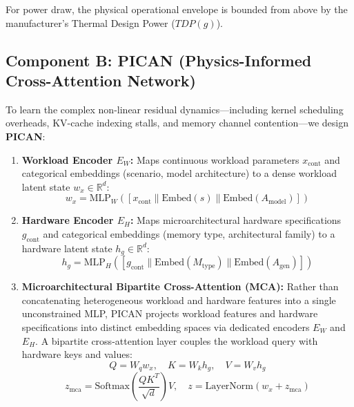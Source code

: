 \documentclass[preprint,12pt]{elsarticle}
\begin{document}
For power draw, the physical operational envelope is bounded from above by the manufacturer's Thermal Design Power ($TDP(g)$).

\subsection{Component B: PICAN (Physics-Informed Cross-Attention Network)}
To learn the complex non-linear residual dynamics---including kernel scheduling overheads, KV-cache indexing stalls, and memory channel contention---we design \textbf{PICAN}:

\begin{enumerate}
    \item \textbf{Workload Encoder $E_W$:} Maps continuous workload parameters $x_{\text{cont}}$ and categorical embeddings (scenario, model architecture) to a dense workload latent state $w_x \in \mathbb{R}^d$:
    \begin{equation}
    w_x = \text{MLP}_W\left( [x_{\text{cont}} \parallel \text{Embed}(s) \parallel \text{Embed}(A_{\text{model}})] \right)
    \end{equation}
    \item \textbf{Hardware Encoder $E_H$:} Maps microarchitectural hardware specifications $g_{\text{cont}}$ and categorical embeddings (memory type, architectural family) to a hardware latent state $h_g \in \mathbb{R}^d$:
    \begin{equation}
    h_g = \text{MLP}_H\left( [g_{\text{cont}} \parallel \text{Embed}(M_{\text{type}}) \parallel \text{Embed}(A_{\text{gen}})] \right)
    \end{equation}
    \item \textbf{Microarchitectural Bipartite Cross-Attention (MCA):} Rather than concatenating heterogeneous workload and hardware features into a single unconstrained MLP, PICAN projects workload features and hardware specifications into distinct embedding spaces via dedicated encoders $E_W$ and $E_H$. A bipartite cross-attention layer couples the workload query with hardware keys and values:
    \begin{equation}
    Q = W_q w_x, \quad K = W_k h_g, \quad V = W_v h_g
    \end{equation}
    \begin{equation}
    z_{\text{mca}} = \text{Softmax}\left(\frac{Q K^T}{\sqrt{d}}\right) V, \quad z = \text{LayerNorm}(w_x + z_{\text{mca}})
    \end{equation}


\end{enumerate}
\end{document}
